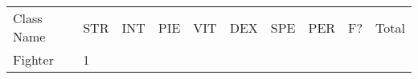 \documentclass[12pt]{article}
\begin{document}
\begin{longtable}[]{@{}llllllllll@{}}
\toprule
\begin{minipage}[t]{0.13\columnwidth}\raggedright\strut
Class Name
\strut\end{minipage} &
\begin{minipage}[t]{0.06\columnwidth}\raggedright\strut
STR
\strut\end{minipage} &
\begin{minipage}[t]{0.06\columnwidth}\raggedright\strut
INT
\strut\end{minipage} &
\begin{minipage}[t]{0.06\columnwidth}\raggedright\strut
PIE
\strut\end{minipage} &
\begin{minipage}[t]{0.06\columnwidth}\raggedright\strut
VIT
\strut\end{minipage} &
\begin{minipage}[t]{0.06\columnwidth}\raggedright\strut
DEX
\strut\end{minipage} &
\begin{minipage}[t]{0.06\columnwidth}\raggedright\strut
SPE
\strut\end{minipage} &
\begin{minipage}[t]{0.06\columnwidth}\raggedright\strut
PER
\strut\end{minipage} &
\begin{minipage}[t]{0.07\columnwidth}\raggedright\strut
F?
\strut\end{minipage} &
\begin{minipage}[t]{0.08\columnwidth}\raggedright\strut
Total
\strut\end{minipage}\tabularnewline
\begin{minipage}[t]{0.13\columnwidth}\raggedright\strut
Fighter
\strut\end{minipage} &
\begin{minipage}[t]{0.06\columnwidth}\raggedright\strut
1
\strut\end{minipage} &
\begin{minipage}[t]{0.06\columnwidth}\raggedright\strut
\strut\end{minipage} &
\begin{minipage}[t]{0.06\columnwidth}\raggedright\strut
\strut\end{minipage} &
\begin{minipage}[t]{0.06\columnwidth}\raggedright\strut
\strut\end{minipage} &
\begin{minipage}[t]{0.06\columnwidth}\raggedright\strut

\end{minipage}
\end{longtable}
\end{document}
